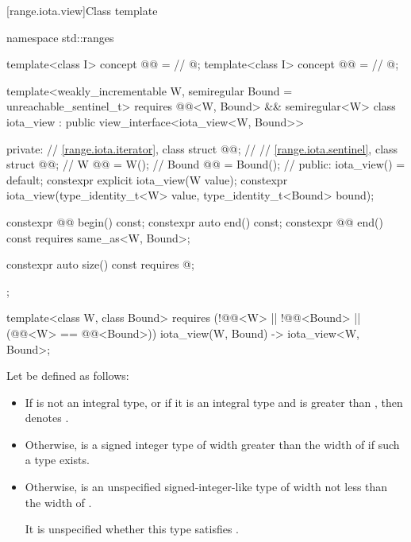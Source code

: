 [range.iota.view]{Class template }

%
\begin{codeblock}
namespace std::ranges {
  template<class I>
    concept @@ =     // \expos
      @\seebelow@;
  template<class I>
    concept @@ =       // \expos
      @\seebelow@;

  template<weakly_incrementable W, semiregular Bound = unreachable_sentinel_t>
    requires @@<W, Bound> && semiregular<W>
  class iota_view : public view_interface<iota_view<W, Bound>> {
  private:
    // \ref{range.iota.iterator}, class 
    struct @@;            // \expos
    // \ref{range.iota.sentinel}, class 
    struct @@;            // \expos
    W @@ = W();             // \expos
    Bound @@ = Bound();     // \expos
  public:
    iota_view() = default;
    constexpr explicit iota_view(W value);
    constexpr iota_view(type_identity_t<W> value,
                        type_identity_t<Bound> bound);

    constexpr @@ begin() const;
    constexpr auto end() const;
    constexpr @@ end() const requires same_as<W, Bound>;

    constexpr auto size() const requires @\seebelow@;
  };

  template<class W, class Bound>
    requires (!@@<W> || !@@<Bound> ||
      (@@<W> == @@<Bound>))
    iota_view(W, Bound) -> iota_view<W, Bound>;
}
\end{codeblock}

\pnum
Let  be defined as follows:
\begin{itemize}
\item
  If  is not an integral type, or
  if it is an integral type and 
  is greater than ,
  then  denotes .
\item
  Otherwise, 
  is a signed integer type of width greater than the width of 
  if such a type exists.
\item
  Otherwise, 
  is an unspecified signed-integer-like type
  of width not less than the width of .
  \begin{note}
  It is unspecified
  whether this type satisfies .
  \end{note}
\end{itemize}


